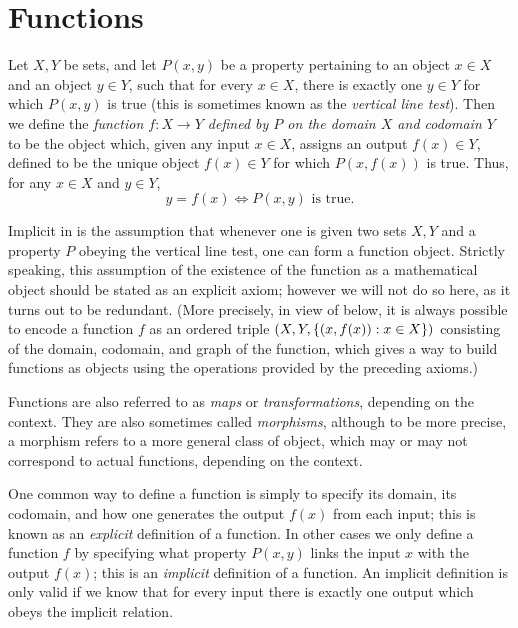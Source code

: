 \section{Functions}\label{i:sec:3.3}

\begin{defn}[Functions]\label{i:3.3.1}
  Let \(X, Y\) be sets, and let \(P(x, y)\) be a property pertaining to an object \(x \in X\) and an object \(y \in Y\), such that for every \(x \in X\), there is exactly one \(y \in Y\) for which \(P(x, y)\) is true (this is sometimes known as the \emph{vertical line test}).
  Then we define the \emph{function \(f : X \to Y\) defined by \(P\) on the domain \(X\) and codomain \(Y\)} to be the object which, given any input \(x \in X\), assigns an output \(f(x) \in Y\), defined to be the unique object \(f(x) \in Y\) for which \(P(x, f(x))\) is true.
  Thus, for any \(x \in X\) and \(y \in Y\),
  \[
    y = f(x) \iff P(x, y) \text{ is true}.
  \]
\end{defn}

\begin{note}
  Implicit in  is the assumption that whenever one is given two sets \(X, Y\) and a property \(P\) obeying the vertical line test, one can form a function object.
  Strictly speaking, this assumption of the existence of the function as a mathematical object should be stated as an explicit axiom;
  however we will not do so here, as it turns out to be redundant.
  (More precisely, in view of  below, it is always possible to encode a function \(f\) as an ordered triple \((X, Y, \left\lbrace(x, f(x)) : x \in X\right\rbrace)\) consisting of the domain, codomain, and graph of the function, which gives a way to build functions as objects using the operations provided by the preceding axioms.)
\end{note}

\begin{note}
  Functions are also referred to as \emph{maps} or \emph{transformations}, depending on the context.
  They are also sometimes called \emph{morphisms}, although to be more precise, a morphism refers to a more general class of object, which may or may not correspond to actual functions, depending on the context.
\end{note}

\begin{note}
  One common way to define a function is simply to specify its domain, its codomain, and how one generates the output \(f(x)\) from each input;
  this is known as an \emph{explicit} definition of a function.
  In other cases we only define a function \(f\) by specifying what property \(P(x, y)\) links the input \(x\) with the output \(f(x)\);
  this is an \emph{implicit} definition of a function.
  An implicit definition is only valid if we know that for every input there is exactly one output which obeys the implicit relation.
\end{note}

